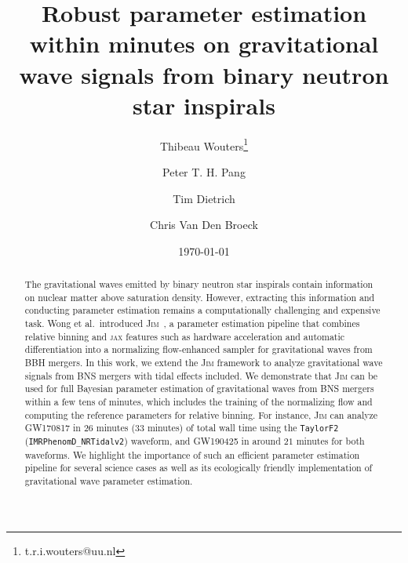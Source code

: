 \documentclass[prd,twocolumn,a4paper,floatfix,nofootinbib,preprintnumbers,superscriptaddress]{revtex4-1}
\begin{document}
\title{Robust parameter estimation within minutes on gravitational wave signals from binary neutron star inspirals}

\author{Thibeau Wouters\thanks{t.r.i.wouters@uu.nl} }
\author{Peter T. H. Pang }
\author{Tim Dietrich }
\author{Chris Van Den Broeck }
\date{\today}

\begin{abstract}
\noindent The gravitational waves emitted by binary neutron star inspirals contain information on nuclear matter above saturation density. However, extracting this information and conducting parameter estimation remains a computationally challenging and expensive task. Wong et al.~introduced \textsc{Jim}~\cite{Wong:2023lgb}, a parameter estimation pipeline that combines relative binning and \textsc{jax} features such as hardware acceleration and automatic differentiation into a normalizing flow-enhanced sampler for gravitational waves from \ac{BBH} mergers. In this work, we extend the \textsc{Jim} framework to analyze gravitational wave signals from \ac{BNS} mergers with tidal effects included. We demonstrate that \textsc{Jim} can be used for full Bayesian parameter estimation of gravitational waves from \ac{BNS} mergers within a few tens of minutes, which includes the training of the normalizing flow and computing the reference parameters for relative binning. For instance, \textsc{Jim} can analyze GW170817 in $26$ minutes ($33$ minutes) of total wall time using the \texttt{TaylorF2} (\texttt{IMRPhenomD\_NRTidalv2}) waveform, and GW190425 in around $21$ minutes for both waveforms. We highlight the importance of such an efficient parameter estimation pipeline for several science cases as well as its ecologically friendly implementation of gravitational wave parameter estimation. 
\end{abstract}
\end{document}
